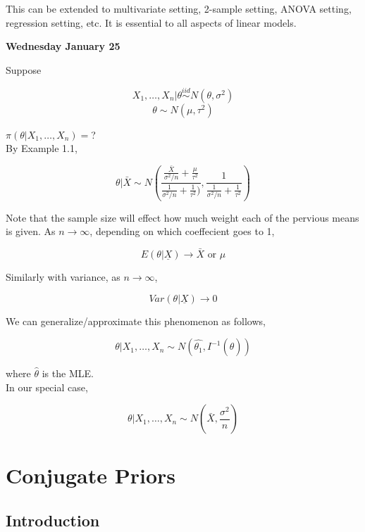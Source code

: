 \documentclass[11pt,fleqn]{book} %
\begin{document}
This can be extended to multivariate setting, 2-sample setting, ANOVA setting, regression setting, etc. It is essential to all aspects of linear models. 



\textbf{Wednesday January 25}\\

\begin{example}
	Suppose

			$$X_1, \dots, X_n | \theta \stackrel{iid}{\sim} N(\theta, \sigma^2) $$
			$$\theta \sim N(\mu, \tau^2) $$

	$\pi(\theta| X_1, \dots, X_n) =$?\\


	By Example 1.1, 

			$$\theta | \bar{X} \sim N\left(\frac{\frac{\bar{X}}{\sigma^2/n} + \frac{\mu}{\tau^2}}{\frac{1}{\sigma^{2}/n} + \frac{1}{\tau^{2}})}, \frac{1}{\frac{1}{\sigma^2/n} + \frac{1}{\tau^2}} \right) $$


	Note that the sample size will effect how much weight each of the pervious means is given. As $n \rightarrow \infty$, depending on which coeffecient goes to 1, 

			$$E(\theta | \underline{X}) \rightarrow \bar{X} \text{ or } \mu $$

	Similarly with variance, as $n \rightarrow \infty$, 

			$$Var(\theta| \underline{X}) \rightarrow 0 $$

	We can generalize/approximate this phenomenon as follows, 

			$$\theta|X_1, \dots, X_n \sim N(\hat{\theta_1}, I^{-1}(\hat{\theta})) $$

	where $\hat{\theta}$ is the MLE. \\

	In our special case, 

			$$\theta| X_1, \dots, X_n \sim N(\bar{X}, \frac{\sigma^2}{n}) $$


\end{example}


	\section{Conjugate Priors}

	\subsection{Introduction}
\end{document}
